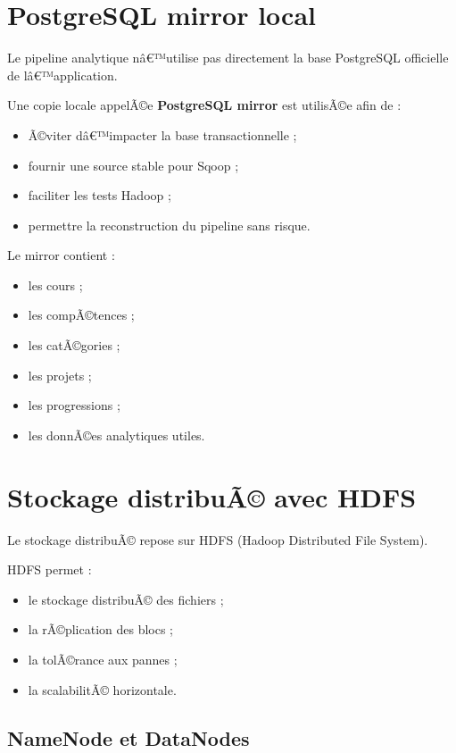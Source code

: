 ﻿\documentclass[12pt,a4paper]{report}
\begin{document}
\section{PostgreSQL mirror local}

Le pipeline analytique nâ€™utilise pas directement la base PostgreSQL officielle de lâ€™application.

Une copie locale appelÃ©e \textbf{PostgreSQL mirror} est utilisÃ©e afin de :
\begin{itemize}
    \item Ã©viter dâ€™impacter la base transactionnelle ;
    \item fournir une source stable pour Sqoop ;
    \item faciliter les tests Hadoop ;
    \item permettre la reconstruction du pipeline sans risque.
\end{itemize}

Le mirror contient :
\begin{itemize}
    \item les cours ;
    \item les compÃ©tences ;
    \item les catÃ©gories ;
    \item les projets ;
    \item les progressions ;
    \item les donnÃ©es analytiques utiles.
\end{itemize}

\section{Stockage distribuÃ© avec HDFS}

Le stockage distribuÃ© repose sur HDFS (Hadoop Distributed File System).

HDFS permet :
\begin{itemize}
    \item le stockage distribuÃ© des fichiers ;
    \item la rÃ©plication des blocs ;
    \item la tolÃ©rance aux pannes ;
    \item la scalabilitÃ© horizontale.
\end{itemize}

\subsection{NameNode et DataNodes}
\end{document}
